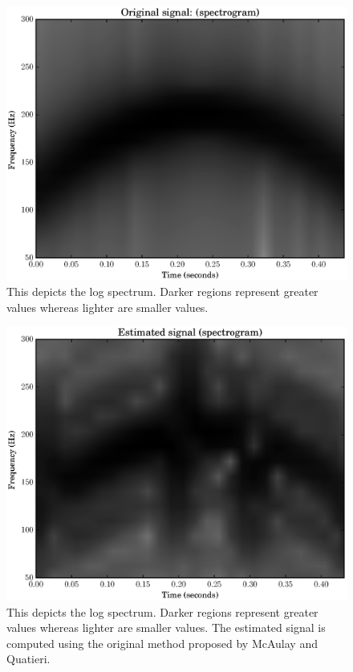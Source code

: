 \begin{figure}[!t]
    \includegraphics[width=\textwidth]{plots/mq_cubic_original_spec.eps}
    \caption{This depicts the log spectrum. Darker regions represent greater
        values whereas lighter are smaller values.
    \label{plot:mqcubicoriginalspec}}
\end{figure}

\begin{figure}[!t]
    \includegraphics[width=\textwidth]{plots/mq_cubic_estimated_spec.eps}
    \caption{This depicts the log spectrum. Darker regions represent greater
        values whereas lighter are smaller values. The estimated signal is
        computed using the original method proposed by McAulay and Quatieri.
    \label{plot:mqcubicestimatedspec}}
\end{figure}

